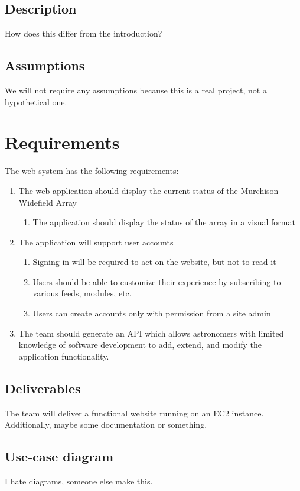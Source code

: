 \documentclass[12pt]{article}
\begin{document}
\begin{spacing}{1.5}
\subsection{Description}
How does this differ from the introduction?

\subsection{Assumptions}
We will not require any assumptions because this is a real project, not a hypothetical one.

\newpage

\section{Requirements}
The web system has the following requirements:
\begin{enumerate}
\item The web application should display the current status of the Murchison Widefield Array
	\begin{enumerate}
	\item The application should display the status of the array in a visual format
	\end{enumerate}
\item The application will support user accounts
	\begin{enumerate}
	\item Signing in will be required to act on the website, but not to read it
	\item Users should be able to customize their experience by subscribing to various feeds, modules, etc.
	\item Users can create accounts only with permission from a site admin
	\end{enumerate}
\item The team should generate an API which allows astronomers with limited knowledge of software development to add, extend, and modify the application functionality.
\end{enumerate}

\subsection{Deliverables}
The team will deliver a functional website running on an EC2 instance. Additionally, maybe some documentation or something.

\subsection{Use-case diagram}
I hate diagrams, someone else make this.


\end{spacing}
\end{document}
